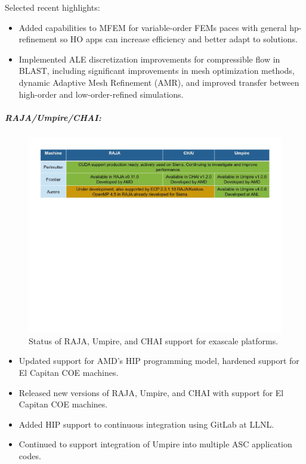 Selected recent highlights:
\begin{itemize}
\item Added capabilities to MFEM for variable-order FEMs paces with general hp-refinement so HO apps can increase efficiency and better adapt to solutions.
\item Implemented ALE discretization improvements for compressible flow in BLAST, including significant improvements in mesh optimization methods, dynamic Adaptive Mesh Refinement (AMR), and improved transfer between high-order and low-order-refined simulations.

\end{itemize}

\subparagraph{RAJA/Umpire/CHAI:}
\begin{figure}[htb]
\centering
\includegraphics[width=\textwidth]{projects/2.3.6-NNSA/2.3.6.02-LLNL-ATDM/raja-umpire-chai-support}
\caption{
Status of RAJA, Umpire, and CHAI support for exascale platforms.
}
\end{figure}

\begin{itemize}
\item Updated support for AMD's HIP programming model, hardened support for El Capitan COE machines.
\item Released new versions of RAJA, Umpire, and CHAI with support for El Capitan COE machines.
\item Added HIP support to continuous integration using GitLab at LLNL.
\item Continued to support integration of Umpire into multiple ASC application codes.
\end{itemize}


